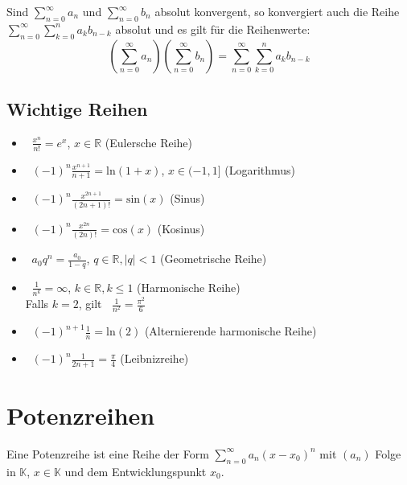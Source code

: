 \documentclass[a4paper, 11pt, accentcolor = tud3b]{tudreport}
\DeclareMathOperator{\suminfty}{\sum _ { n = 0 } ^ \infty}
\begin{document}
            Sind $ \sum _ { n = 0 } ^ { \infty } a _ n $ und $ \sum _ { n = 0 } ^ { \infty } b _ n $ absolut konvergent, so konvergiert auch die Reihe $ \sum _ { n = 0 } ^ \infty \sum _ { k = 0 } ^ n a _ k b _ { n - k } $ absolut und es gilt für die Reihenwerte:
            \begin{equation*}
                (\sum _ { n = 0 } ^ { \infty } a _ n) (\sum _ { n = 0 } ^ { \infty } b _ n) = \sum _ { n = 0 } ^ \infty \sum _ { k = 0 } ^ n a _ k b _ { n - k }
            \end{equation*}

        \section{Wichtige Reihen}
            \begin{itemize}
                \item $ \suminfty \frac{x ^ n}{n!} = e ^ x $, $ x \in \mathbb{R} $ (Eulersche Reihe)
                \item $ \suminfty (-1) ^ n \frac{x ^ { n + 1 }}{n + 1} = \text{ln}(1 + x) $, $ x \in (-1, 1] $ (Logarithmus)
                \item $ \suminfty (-1) ^ n \frac{x ^ { 2n + 1 }}{(2n + 1)!} = \text{sin}(x) $ (Sinus)
                \item $ \suminfty (-1) ^ n \frac{x ^ { 2n }}{(2n)!} = \text{cos}(x) $ (Kosinus)
                \item $ \suminfty a _ 0 q ^ n = \frac{a _ 0}{1 - q} $, $ q \in \mathbb{R}, \lvert q \rvert < 1 $ (Geometrische Reihe)
                \item $ \suminfty \frac{1}{n ^ k} = \infty $, $ k \in \mathbb{R}, k \leq 1 $ (Harmonische Reihe) \\ Falls $ k = 2 $, gilt $ \suminfty \frac{1}{n ^ 2} = \frac{\pi ^ 2}{6} $
                \item $ \suminfty (-1) ^ { n + 1 } \frac{1}{n} = \text{ln}(2) $ (Alternierende harmonische Reihe)
                \item $ \suminfty (-1) ^ n \frac{1}{2n + 1} = \frac{\pi}{4} $ (Leibnizreihe)
            \end{itemize}

    \chapter{Potenzreihen}
        Eine Potenzreihe ist eine Reihe der Form $ \sum _ { n = 0 } ^ \infty a _ n (x - x _ 0) ^ n $ mit $ (a _ n) $ Folge in $ \mathbb{K} $, $ x \in \mathbb{K} $ und dem Entwicklungspunkt $ x _ 0 $.
\end{document}
